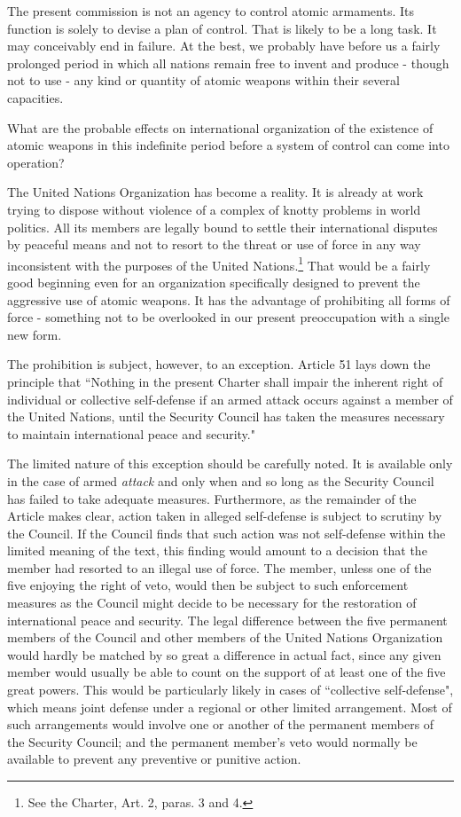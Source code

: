 The present commission is not an agency to control atomic armaments. Its function is solely to devise a plan of control. That is likely to be a long task. It may conceivably end in failure. At the best, we probably have before us a fairly prolonged period in which all nations remain free to invent and produce - though not to use - any kind or quantity of atomic weapons within their several capacities.

What are the probable effects on international organization of the existence of atomic weapons in this indefinite period before a system of control can come into operation?

The United Nations Organization has become a reality. It is already at work trying to dispose without violence of a complex of knotty problems in world politics. All its members are legally bound to settle their international disputes by peaceful means and not to resort to the threat or use of force in any way inconsistent with the purposes of the United Nations.\footnote{See the Charter, Art. 2, paras. 3 and 4.} That would be a fairly good beginning even for an organization specifically designed to prevent the aggressive use of atomic weapons. It has the advantage of prohibiting all forms of force - something not to be overlooked in our present preoccupation with a single new form.

The prohibition is subject, however, to an exception. Article 51 lays down the principle that ``Nothing in the present Charter shall impair the inherent right of individual or collective self-defense if an armed attack occurs against a member of the United Nations, until the Security Council has taken the measures necessary to maintain international peace and security."

The limited nature of this exception should be carefully noted. It is available only in the case of armed \emph{attack} and only when and so long as the Security Council has failed to take adequate measures. Furthermore, as the remainder of the Article makes clear, action taken in alleged self-defense is subject to scrutiny by the Council. If the Council finds that such action was not self-defense within the limited meaning of the text, this finding would amount to a decision that the member had resorted to an illegal use of force. The member, unless one of the five enjoying the right of veto, would then be subject to such enforcement measures as the Council might decide to be necessary for the restoration of international peace and security. The legal difference between the five permanent members of the Council and other members of the United Nations Organization would hardly be matched by so great a difference in actual fact, since any given member would usually be able to count on the support of at least one of the five great powers. This would be particularly likely in cases of ``collective self-defense", which means joint defense under a regional or other limited arrangement. Most of such arrangements would involve one or another of the permanent members of the Security Council; and the permanent member's veto would normally be available to prevent any preventive or punitive action.

